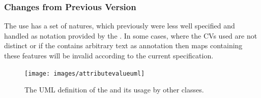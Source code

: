 



\subsubsection{Changes from Previous Version}

The use  has a set of natures, which previously
were less well specified and handled as notation provided by the
.  In some cases, where the CVs used are
not distinct or if the  contains arbitrary
text as annotation then maps containing these features will be invalid
according to the current specification.

\label{defn:AttributeValue}

\begin{figure}[htb]
  \centering
  \texttt{[image: images/attributevalueuml]}
  \caption{The UML definition of the  and
    its usage by other classes.}
  \label{fig:techref:attributevalueuml}
\end{figure}

